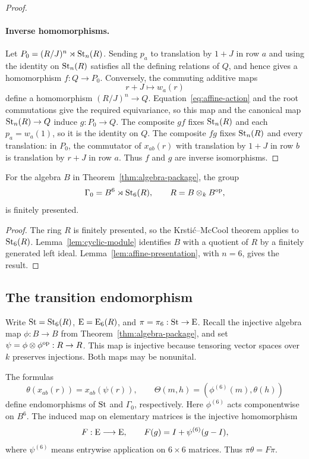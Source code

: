 \begin{proof}
\paragraph{Inverse homomorphisms.}
Let $P_0=(R/J)^n\rtimes\operatorname{St}_n(R)$.  Sending $p_a$ to translation by
$1+J$ in row $a$ and using the identity on $\operatorname{St}_n(R)$ satisfies
all the defining relations of $Q$, and hence gives a homomorphism
$f:Q\to P_0$.  Conversely, the commuting additive maps
\[
 r+J\longmapsto w_a(r)
\]
define a homomorphism $(R/J)^n\to Q$.
Equation~\eqref{eq:affine-action} and the root commutations give
the required equivariance, so this map and the canonical map
$\operatorname{St}_n(R)\to Q$ induce $g:P_0\to Q$.
The composite $gf$ fixes $\operatorname{St}_n(R)$ and each
$p_a=w_a(1)$, so it is the identity on $Q$.
The composite $fg$ fixes $\operatorname{St}_n(R)$ and every translation:
in $P_0$, the commutator of $x_{ab}(r)$ with translation by $1+J$
in row $b$ is translation by $r+J$ in row $a$.
Thus $f$ and $g$ are inverse isomorphisms.
\end{proof}

\begin{proposition}\label{prop:affine}
For the algebra $B$ in Theorem~\ref{thm:algebra-package}, the group
\[
 \Gamma_0=B^6\rtimes\operatorname{St}_6(R),\qquad R=B\otimes_kB^{\mathrm{op}},
\]
is finitely presented.
\end{proposition}

\begin{proof}
The ring $R$ is finitely presented, so the Krsti\'c--McCool theorem
applies to $\operatorname{St}_6(R)$.  Lemma~\ref{lem:cyclic-module} identifies $B$
with a quotient of $R$ by a finitely generated left ideal.
Lemma~\ref{lem:affine-presentation}, with $n=6$, gives the result.
\end{proof}

\subsection{The transition endomorphism}

Write $\operatorname{St}=\operatorname{St}_6(R)$, $\operatorname{E}=\operatorname{E}_6(R)$, and
$\pi=\pi_6:\operatorname{St}\to\operatorname{E}$.  Recall the injective algebra map
$\phi:B\to B$ from Theorem~\ref{thm:algebra-package}, and set
$\psi=\phi\otimes\phi^{\mathrm{op}}:R\to R$.
This map is injective because tensoring vector spaces over $k$
preserves injections.  Both maps may be nonunital.

\begin{lemma}\label{lem:transition}
The formulas
\[
 \theta(x_{ab}(r))=x_{ab}(\psi(r)),\qquad
 \Theta(m,h)=(\phi^{(6)}(m),\theta(h))
\]
define endomorphisms of $\operatorname{St}$ and $\Gamma_0$, respectively.
Here $\phi^{(6)}$ acts componentwise on $B^6$.
The induced map on elementary matrices is the injective
homomorphism
\begin{equation}\label{eq:matrix-transition}
 F:\operatorname{E}\longrightarrow\operatorname{E},
 \qquad F(g)=I+\psi^{(6)}(g-I),
\end{equation}
where $\psi^{(6)}$ means entrywise application on $6\times6$
matrices.  Thus $\pi\theta=F\pi$.
\end{lemma}

